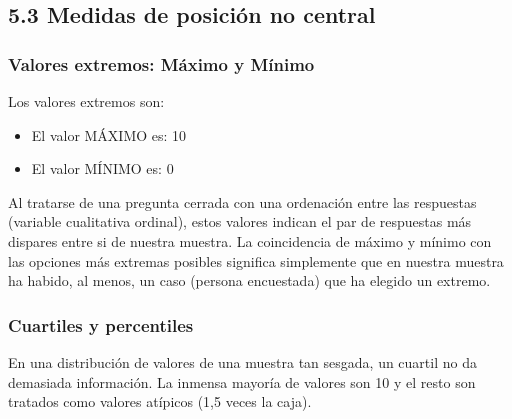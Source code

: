 \documentclass[
  12 pt,
  a4paper,
]{article}
\newenvironment{Shaded}{\begin{snugshade}}{\end{snugshade}}
\newcommand{\AttributeTok}[1]{\textcolor[rgb]{0.13,0.29,0.53}{#1}}
\newcommand{\CommentTok}[1]{\textcolor[rgb]{0.56,0.35,0.01}{\textit{#1}}}
\newcommand{\ConstantTok}[1]{\textcolor[rgb]{0.56,0.35,0.01}{#1}}
\newcommand{\FunctionTok}[1]{\textcolor[rgb]{0.13,0.29,0.53}{\textbf{#1}}}
\newcommand{\NormalTok}[1]{#1}
\newcommand{\OtherTok}[1]{\textcolor[rgb]{0.56,0.35,0.01}{#1}}
\newcommand{\SpecialCharTok}[1]{\textcolor[rgb]{0.81,0.36,0.00}{\textbf{#1}}}
\providecommand{\tightlist}{%
  \setlength{\itemsep}{0pt}\setlength{\parskip}{0pt}}
\begin{document}
\hypertarget{medidas-de-posiciuxf3n-no-central}{%
\subsection{5.3 Medidas de posición no
central}\label{medidas-de-posiciuxf3n-no-central}}

\hypertarget{valores-extremos-muxe1ximo-y-muxednimo}{%
\subsubsection{Valores extremos: Máximo y
Mínimo}\label{valores-extremos-muxe1ximo-y-muxednimo}}

\begin{Shaded}
\end{Shaded}

Los valores extremos son:

\begin{itemize}
\tightlist
\item
  El valor MÁXIMO es: 10
\item
  El valor MÍNIMO es: 0
\end{itemize}

Al tratarse de una pregunta cerrada con una ordenación entre las
respuestas (variable cualitativa ordinal), estos valores indican el par
de respuestas más dispares entre si de nuestra muestra. La coincidencia
de máximo y mínimo con las opciones más extremas posibles significa
simplemente que en nuestra muestra ha habido, al menos, un caso (persona
encuestada) que ha elegido un extremo.

\hypertarget{cuartiles-y-percentiles}{%
\subsubsection{Cuartiles y percentiles}\label{cuartiles-y-percentiles}}

En una distribución de valores de una muestra tan sesgada, un cuartil no
da demasiada información. La inmensa mayoría de valores son 10 y el
resto son tratados como valores atípicos (1,5 veces la caja).
\end{document}
